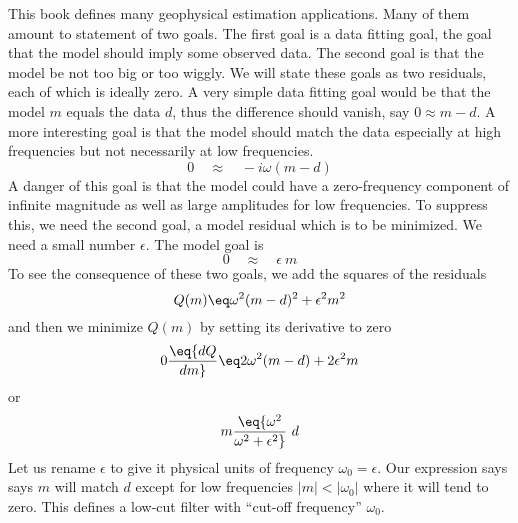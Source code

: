 This book defines many geophysical estimation applications.
Many of them amount to statement of two goals.
The first goal is a data fitting goal,
the goal that the model should imply some observed data.
The second goal is that the model be not too big or too wiggly.
We will state these goals as two residuals, each of which is ideally zero.
A very simple data fitting goal would be that
the model $m$ equals the data $d$,
thus the difference should vanish, say $0\approx  m- d$.
A more interesting goal is that the model should match the data
especially at high frequencies but not necessarily at low frequencies.
\begin{equation}
0 \quad\approx\quad  -i\omega(m - d)
\end{equation}
A danger of this goal is that the model could have a zero-frequency component
of infinite magnitude as well as large amplitudes for low frequencies.
To suppress this, we need the second goal, a model residual
which is to be minimized.  We need a small number $\epsilon$.
The model goal is
\begin{equation}
0 \quad\approx\quad \epsilon \ m
\end{equation}
To see the consequence of these two goals,
we add the squares of the residuals
\begin{equation}
 Q(m) \eq \omega^2 (m-d)^2 + \epsilon^2  m^2
\end{equation}
and then we minimize $Q(m)$ by setting its derivative to zero
\begin{equation}
0\eq {dQ\over dm} \eq 2 \omega^2 (m-d) + 2\epsilon^2  m
\end{equation}
or
\begin{equation}
m \eq  {\omega^2 \over \omega^2+ \epsilon^2}\  d
\label{eqn:lowcut}
\end{equation}
Let us rename $\epsilon$ to give it physical units of frequency $\omega_0 = \epsilon$.
Our expression says
says $m$ will match $d$ except for low frequencies $|m| <|\omega_0|$ where it will tend to zero.
This defines a low-cut filter with 
``cut-off frequency''  $\omega_0$.


%	
	
